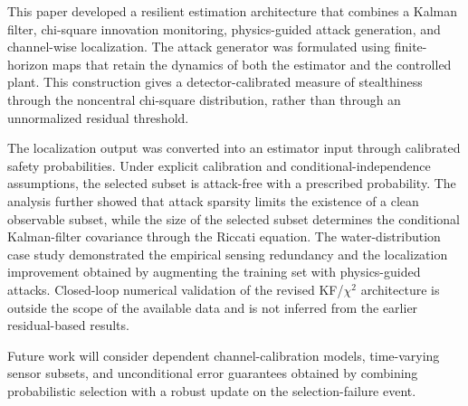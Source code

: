 This paper developed a resilient estimation architecture that combines a Kalman filter, chi-square innovation monitoring, physics-guided attack generation, and channel-wise localization. The attack generator was formulated using finite-horizon maps that retain the dynamics of both the estimator and the controlled plant. This construction gives a detector-calibrated measure of stealthiness through the noncentral chi-square distribution, rather than through an unnormalized residual threshold.

The localization output was converted into an estimator input through calibrated safety probabilities. Under explicit calibration and conditional-independence assumptions, the selected subset is attack-free with a prescribed probability. The analysis further showed that attack sparsity limits the existence of a clean observable subset, while the size of the selected subset determines the conditional Kalman-filter covariance through the Riccati equation. The water-distribution case study demonstrated the empirical sensing redundancy and the localization improvement obtained by augmenting the training set with physics-guided attacks. Closed-loop numerical validation of the revised KF/$\chi^2$ architecture is outside the scope of the available data and is not inferred from the earlier residual-based results.

Future work will consider dependent channel-calibration models, time-varying sensor subsets, and unconditional error guarantees obtained by combining probabilistic selection with a robust update on the selection-failure event.
